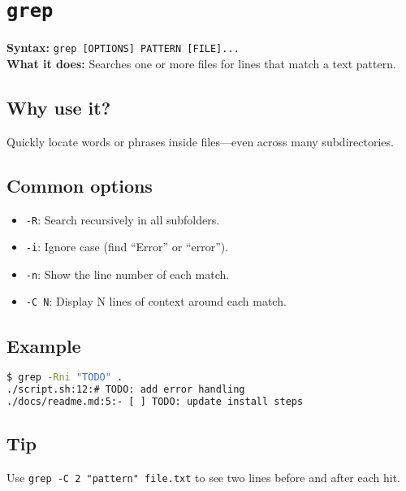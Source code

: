 \documentclass[10pt,oneside]{scrbook}
\begin{document}
\section{\texttt{grep}}
\begin{cmdbox}
  \textbf{Syntax:} \lstinline!grep [OPTIONS] PATTERN [FILE]...! \\
  \textbf{What it does:} Searches one or more files for lines that match a text pattern.
\end{cmdbox}
\begin{commanddetails}
  \subsection*{Why use it?}
    Quickly locate words or phrases inside files—even across many subdirectories.

  \subsection*{Common options}
  \begin{itemize}
    \item \lstinline!-R!: Search recursively in all subfolders.
    \item \lstinline!-i!: Ignore case (find “Error” or “error”).
    \item \lstinline!-n!: Show the line number of each match.
    \item \lstinline!-C N!: Display N lines of context around each match.
  \end{itemize}

  \subsection*{Example}
  \begin{lstlisting}[language=bash]
$ grep -Rni "TODO" .
./script.sh:12:# TODO: add error handling
./docs/readme.md:5:- [ ] TODO: update install steps
  \end{lstlisting}

  \subsection*{Tip}
    Use \lstinline!grep -C 2 "pattern" file.txt! to see two lines before and after each hit.
\end{commanddetails}

\end{document}
